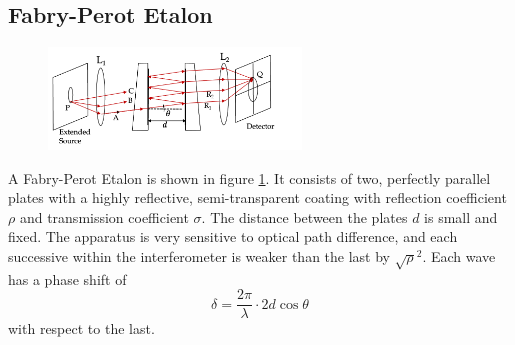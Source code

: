 \documentclass{book}
\begin{document}
{\subsection{Fabry-Perot Etalon}
\begin{figure}
	\centering
	\includegraphics[width=0.6\textwidth]{fabry-perot-interferometer-setup.png}
	\caption{}
	\label{fig:fabryperot}
\end{figure}
A Fabry-Perot Etalon is shown in figure \ref{fig:fabryperot}. It consists of two, perfectly parallel plates with a highly reflective, semi-transparent coating with reflection coefficient $\rho$ and transmission coefficient $\sigma$. The distance between the plates $d$ is small and fixed. The apparatus is very sensitive to optical path difference, and each successive within the interferometer is weaker than the last by $\sqrt{\rho}^2$. Each wave has a phase shift of
\begin{equation}
	\delta = \frac{2\pi}{\lambda}\cdot2d\cos\theta
\end{equation}
with respect to the last. 
}
\end{document}
